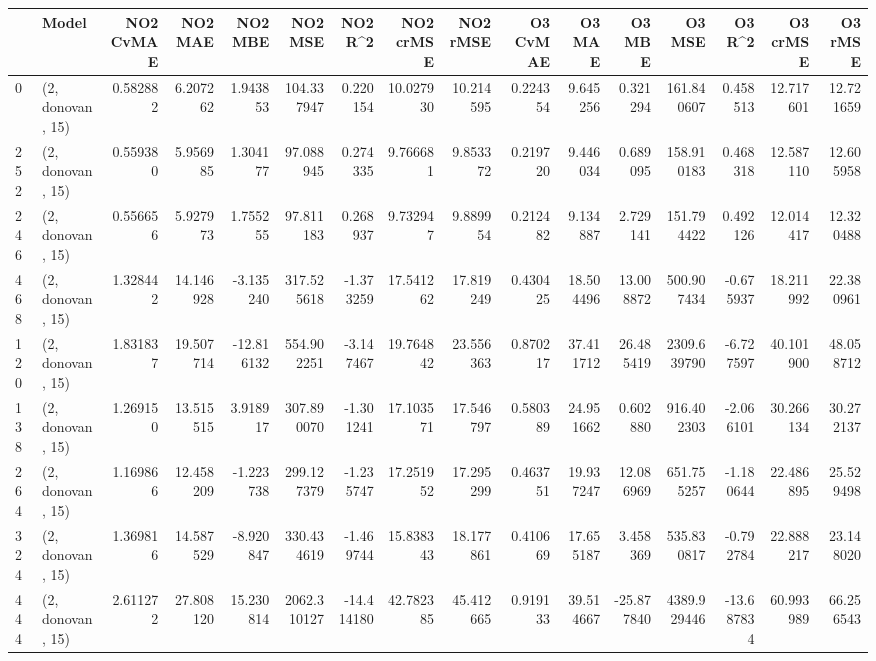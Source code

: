 \begin{tabular}{llrrrrrrrrrrrrrr}
\toprule
{} &             Model &  NO2 CvMAE &    NO2 MAE &    NO2 MBE &      NO2 MSE &    NO2 R\textasciicircum2 &  NO2 crMSE &   NO2 rMSE &  O3 CvMAE &     O3 MAE &     O3 MBE &       O3 MSE &     O3 R\textasciicircum2 &   O3 crMSE &    O3 rMSE \\
\midrule
0   &  (2, donovan, 15) &   0.582882 &   6.207262 &   1.943853 &   104.337947 &   0.220154 &  10.027930 &  10.214595 &  0.224354 &   9.645256 &   0.321294 &   161.840607 &   0.458513 &  12.717601 &  12.721659 \\
252 &  (2, donovan, 15) &   0.559380 &   5.956985 &   1.304177 &    97.088945 &   0.274335 &   9.766681 &   9.853372 &  0.219720 &   9.446034 &   0.689095 &   158.910183 &   0.468318 &  12.587110 &  12.605958 \\
246 &  (2, donovan, 15) &   0.556656 &   5.927973 &   1.755255 &    97.811183 &   0.268937 &   9.732947 &   9.889954 &  0.212482 &   9.134887 &   2.729141 &   151.794422 &   0.492126 &  12.014417 &  12.320488 \\
468 &  (2, donovan, 15) &   1.328442 &  14.146928 &  -3.135240 &   317.525618 &  -1.373259 &  17.541262 &  17.819249 &  0.430425 &  18.504496 &  13.008872 &   500.907434 &  -0.675937 &  18.211992 &  22.380961 \\
120 &  (2, donovan, 15) &   1.831837 &  19.507714 & -12.816132 &   554.902251 &  -3.147467 &  19.764842 &  23.556363 &  0.870217 &  37.411712 &  26.485419 &  2309.639790 &  -6.727597 &  40.101900 &  48.058712 \\
138 &  (2, donovan, 15) &   1.269150 &  13.515515 &   3.918917 &   307.890070 &  -1.301241 &  17.103571 &  17.546797 &  0.580389 &  24.951662 &   0.602880 &   916.402303 &  -2.066101 &  30.266134 &  30.272137 \\
264 &  (2, donovan, 15) &   1.169866 &  12.458209 &  -1.223738 &   299.127379 &  -1.235747 &  17.251952 &  17.295299 &  0.463751 &  19.937247 &  12.086969 &   651.755257 &  -1.180644 &  22.486895 &  25.529498 \\
324 &  (2, donovan, 15) &   1.369816 &  14.587529 &  -8.920847 &   330.434619 &  -1.469744 &  15.838343 &  18.177861 &  0.410669 &  17.655187 &   3.458369 &   535.830817 &  -0.792784 &  22.888217 &  23.148020 \\
444 &  (2, donovan, 15) &   2.611272 &  27.808120 &  15.230814 &  2062.310127 & -14.414180 &  42.782385 &  45.412665 &  0.919133 &  39.514667 & -25.877840 &  4389.929446 & -13.687834 &  60.993989 &  66.256543 \\

\end{tabular}
